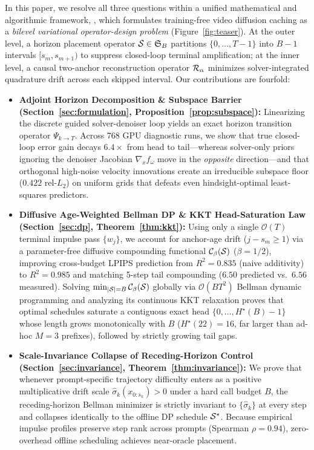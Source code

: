 In this paper, we resolve all three questions within a unified mathematical and algorithmic framework, \textbf{\method{}}, which formulates training-free video diffusion caching as a \emph{bilevel variational operator-design problem} (Figure~\ref{fig:teaser}). At the outer level, a horizon placement operator $\mathcal{S} \in \mathfrak{S}_B$ partitions $\{0,\dots,T-1\}$ into $B-1$ intervals $[s_m, s_{m+1})$ to suppress closed-loop terminal amplification; at the inner level, a causal two-anchor reconstruction operator $\mathcal{R}_\alpha$ minimizes solver-integrated quadrature drift across each skipped interval. Our contributions are fourfold:
\begin{itemize}
\item \textbf{Adjoint Horizon Decomposition \& Subspace Barrier (Section~\ref{sec:formulation}, Proposition~\ref{prop:subspace}):} Linearizing the discrete guided solver-denoiser loop yields an exact horizon transition operator $\Psi_{k\to T}$. Across 768 GPU diagnostic runs, we show that true closed-loop error gain decays $6.4\times$ from head to tail---whereas solver-only priors ignoring the denoiser Jacobian $\nabla_x f_\omega$ move in the \emph{opposite} direction---and that orthogonal high-noise velocity innovations create an irreducible subspace floor ($0.422$ rel-$L_2$) on uniform grids that defeats even hindsight-optimal least-squares predictors.
\item \textbf{Diffusive Age-Weighted Bellman DP \& KKT Head-Saturation Law (Section~\ref{sec:dp}, Theorem~\ref{thm:kkt}):} Using only a single $\mathcal{O}(T)$ terminal impulse pass $\{w_j\}$, we account for anchor-age drift ($j - s_m \ge 1$) via a parameter-free diffusive compounding functional $\mathcal{C}_\beta(\mathcal{S})$ ($\beta=1/2$), improving cross-budget LPIPS prediction from $R^2=0.835$ (naive additivity) to $R^2=0.985$ and matching 5-step tail compounding ($6.50$ predicted vs.\ $6.56$ measured). Solving $\min_{|\mathcal{S}|=B} \mathcal{C}_\beta(\mathcal{S})$ globally via $\mathcal{O}(BT^2)$ Bellman dynamic programming and analyzing its continuous KKT relaxation proves that optimal schedules saturate a contiguous exact head $\{0,\dots,H^\star(B)-1\}$ whose length grows monotonically with $B$ ($H^\star(22)=16$, far larger than ad-hoc $M=3$ prefixes), followed by strictly growing tail gaps.
\item \textbf{Scale-Invariance Collapse of Receding-Horizon Control (Section~\ref{sec:invariance}, Theorem~\ref{thm:invariance}):} We prove that whenever prompt-specific trajectory difficulty enters as a positive multiplicative drift scale $\hat{\sigma}_k(x_{0:s_k}) > 0$ under a hard call budget $B$, the receding-horizon Bellman minimizer is strictly invariant to $\{\hat{\sigma}_k\}$ at every step and collapses identically to the offline DP schedule $\mathcal{S}^\star$. Because empirical impulse profiles preserve step rank across prompts (Spearman $\rho = 0.94$), zero-overhead offline scheduling achieves near-oracle placement.

\end{itemize}
